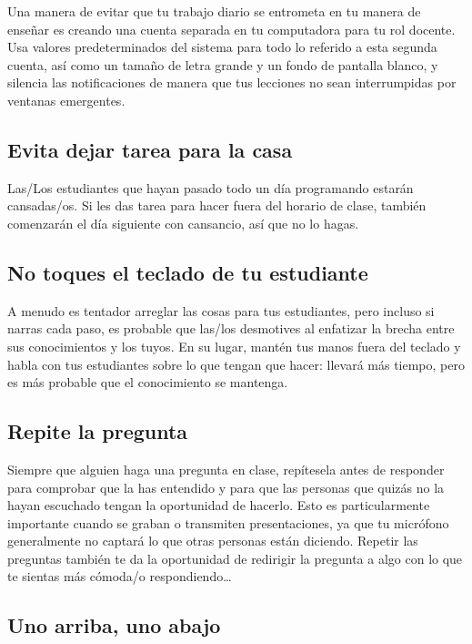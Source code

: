 Una manera de evitar que tu trabajo diario se entrometa en tu manera de enseñar
es creando una cuenta separada en tu computadora para tu rol docente.
Usa valores predeterminados del sistema para todo lo referido a esta segunda cuenta, 
así como un tamaño de letra grande y un fondo de pantalla blanco,
y silencia las notificaciones de manera que tus lecciones no sean interrumpidas por 
ventanas emergentes.

\subsection*{Evita dejar tarea para la casa}

Las/Los estudiantes que hayan pasado todo un día programando estarán cansadas/os.
Si les das tarea para hacer fuera del horario de clase,
también comenzarán el día siguiente con cansancio,
así que no lo hagas.

\subsection*{No toques el teclado de tu estudiante}

A menudo es tentador arreglar las cosas para tus estudiantes,
pero incluso si narras cada paso,
es probable que las/los desmotives
al enfatizar la brecha entre sus conocimientos y los tuyos.
En su lugar,
mantén tus manos fuera del teclado y habla con tus estudiantes sobre lo que tengan que hacer:
llevará más tiempo,
pero es más probable que el conocimiento se mantenga.

\subsection*{Repite la pregunta}

Siempre que alguien haga una pregunta en clase,
repítesela antes de responder
para comprobar que la has entendido
y para que las personas que quizás no la hayan escuchado tengan la oportunidad de hacerlo.
Esto es particularmente importante cuando se graban o transmiten presentaciones,
ya que tu micrófono generalmente no captará lo que otras personas están diciendo. Repetir las preguntas también te da la oportunidad
de redirigir la pregunta a algo con lo que te sientas más cómoda/o respondiendo{\ldots}

\subsection*{Uno arriba, uno abajo}

